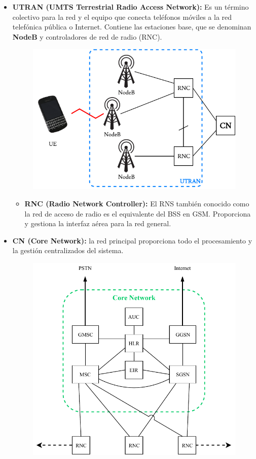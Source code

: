\begin{itemize}
\begin{itemize}
		
		\item \textbf{UTRAN (UMTS Terrestrial Radio Access Network):} Es un término colectivo para la red y el equipo que conecta teléfonos móviles a la red telefónica pública o Internet. Contiene las estaciones base, que se denominan \textbf{NodeB} y controladores de red de radio (RNC).
	\begin{figure}[ht!]
	\centering
	\includegraphics[scale=0.85]{Imagenes/arqUMTS_UTRAN.pdf}
	\end{figure}
	\begin{itemize}
	\item \textbf{RNC (Radio Network Controller):} El RNS también conocido como la red de acceso de radio es el equivalente del BSS en GSM. Proporciona y gestiona la interfaz aérea para la red general.
	\end{itemize}
		\item \textbf{CN (Core Network):} la red principal proporciona todo el procesamiento y la gestión centralizados del sistema.
	\begin{figure}[ht!]
	\centering
	\includegraphics[scale=0.8]{Imagenes/arqUMTS_CN.pdf}
	\end{figure}		
		

\end{itemize}
\end{itemize}
